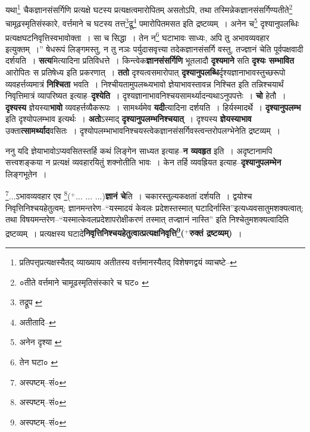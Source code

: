 \documentclass[article,12pt,a4paper]{memoir}
\newcommand{\add}[1]{($^{+}$#1)}
\begin{document}
	यथा\footnote{प्रतिपत्तृप्रत्यक्षस्यैतद् व्याख्याय अतीतस्य वर्त्तमानस्यैतद् विशेषणद्वयं व्याचष्टे--\cite{dp-msD-n}} चैकज्ञानसंसर्गिणि प्रत्यक्षे घटस्य प्रत्यक्षत्वमारोपितम् असतोऽपि, तथा तस्मिन्नेकज्ञानसंसर्गिण्यतीते\footnote{०तीते वर्त्तमाने चामूढस्मृतिसंस्कारे च घट० \cite{dp-msA} \cite{dp-msB} \cite{dp-msC} \cite{dp-msD} \cite{dp-edP} \cite{dp-edH} \cite{dp-edN}} चामूढस्मृतिसंस्कारे, वर्त्तमाने च घटस्य तत्त\footnote{तद्रूप \cite{dp-msA} \cite{dp-msB} \cite{dp-edP} \cite{dp-edH} \cite{dp-edE} \cite{dp-edN}}\-द्रू\footnote{अतीतादि--\cite{dp-msD-n}} पमारोपितमसत इति द्रष्टव्यम् । अनेन च\footnote{अनेन दृश्या \cite{dp-msA} \cite{dp-msB} \cite{dp-edP} \cite{dp-edH} \cite{dp-edE} \cite{dp-edN}} दृश्यानुपलब्धिः प्रत्यक्षघटनिवृत्तिस्वभावोक्ता । सा च सिद्धा । तेन न\footnote{तेन घटा० \cite{dp-msB}} घटाभावः साध्यः, अपि तु अभावव्यवहार इत्युक्तम् ।” षेधरूपं लिङ्गमस्तु, न तु नञः पर्युदासवृत्त्या तदेकज्ञानसंसर्गि वस्तु, तज्ज्ञानं चेति पूर्वपक्षवादी दर्शयति । \textbf{सत्य}मित्यादिना प्रतिविधत्ते । किन्त्वेक\textbf{ज्ञानसंसर्गिणि} भूतलादौ \textbf{दृश्यमाने} सति \textbf{दृश्यः सम्भावित} आरोपितः स प्रतिषेध्य इति प्रकरणात् । \textbf{ततो} दृश्यत्वसमारोपात् \textbf{दृश्यानुपलब्धि}र्दृश्यज्ञानाभावस्तुच्छरूपो व्यवहर्त्तव्यमात्रं \textbf{निश्चिता} भवति । निश्चीयतामुपलब्ध्यभावो ज्ञेयाभावस्तावन्न निश्चित इति तन्निश्चयार्थं निवृत्तिमात्रं व्यापरिष्यत इत्याह--\textbf{दृश्येति} । दृश्यज्ञानाभावनिश्चयसामर्थ्यादन्यथाऽनु\leavevmode{}पपत्तेः । \textbf{चो} हेतौ । \textbf{दृश्यस्य} ज्ञेयस्या\textbf{भावो} व्यवहर्त्तव्यैकरूपः । सामर्थ्यमेव \textbf{यदी}त्यादिना दर्शयति । हिर्यस्मादर्थे । \textbf{दृश्यानुपलम्भ} इति दृश्योपलम्भाव इत्यर्थः । \textbf{अतो}ऽस्माद् \textbf{दृश्यानुपलम्भनिश्चयात्} । दृश्यस्य \textbf{ज्ञेयस्याभाव} उक्ता\textbf{त्सामर्थ्याद}वसितः । दृश्योपलम्भाभावनिश्चयस्त्वेकज्ञानसंसर्गिवस्त्वन्तरोपलग्भेनेति द्रष्टव्यम् ।
	\pend
      

	  \pstart ननु यदि ज्ञेयाभावोऽप्यवसितस्तर्हि कथं लिङ्गेन साध्यत इत्याह--\textbf{न व्यवहृत} इति । अदृष्टानामपि सत्त्वशङ्कया न प्रत्यक्षं व्यवहारयितुं शक्नोतीति भावः । केन तर्हि व्यवह्रियत इत्याह--\textbf{दृश्यानुपलम्भेन} लिङ्गभूतेन ।
	\pend
      

	  \pstart \footnote{अस्पष्टम्--सं०}\-...ऽभावव्यवहार एव \footnote{अस्पष्टम्--सं०}\add{... ... ...}\textbf{ज्ञानं चे}ति । चकारस्तुल्यकक्षतां दर्शयति । द्वयोश्च निवृत्तिनिश्चयहेतुत्वम्; ज्ञानमन्तरेण--“यस्मादयं केवलः प्रदेशस्तस्मात् घटादिर्नास्ति”इत्यध्यवसातुमशक्यत्वात्; तथा विषयमन्तरेण--“यस्मात्केवलप्रदेशापरोक्षीकरणं तस्मात् तज्ज्ञानं नास्ति” इति निश्चेतुमशक्यत्वादिति द्रष्टव्यम् । प्रत्यक्षस्य घटादे\textbf{निवृत्तिनिश्चयहेतुत्वात्प्रत्यक्षनिवृत्ति\footnote{अस्पष्टम्--सं०}\add{रुक्तं द्रष्टव्यम्}} ।
	\pend
      
\end{document}
